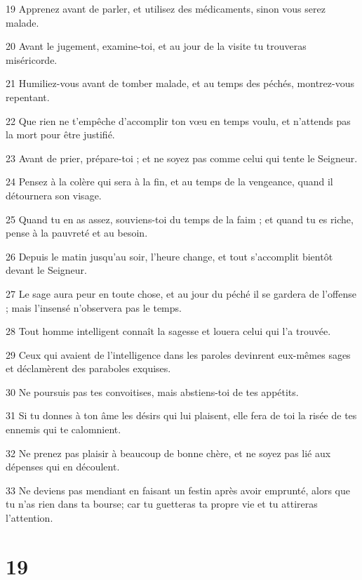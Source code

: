\par 19 Apprenez avant de parler, et utilisez des médicaments, sinon vous serez malade.
\par 20 Avant le jugement, examine-toi, et au jour de la visite tu trouveras miséricorde.
\par 21 Humiliez-vous avant de tomber malade, et au temps des péchés, montrez-vous repentant.
\par 22 Que rien ne t'empêche d'accomplir ton vœu en temps voulu, et n'attends pas la mort pour être justifié.
\par 23 Avant de prier, prépare-toi ; et ne soyez pas comme celui qui tente le Seigneur.
\par 24 Pensez à la colère qui sera à la fin, et au temps de la vengeance, quand il détournera son visage.
\par 25 Quand tu en as assez, souviens-toi du temps de la faim ; et quand tu es riche, pense à la pauvreté et au besoin.
\par 26 Depuis le matin jusqu'au soir, l'heure change, et tout s'accomplit bientôt devant le Seigneur.
\par 27 Le sage aura peur en toute chose, et au jour du péché il se gardera de l'offense ; mais l'insensé n'observera pas le temps.
\par 28 Tout homme intelligent connaît la sagesse et louera celui qui l'a trouvée.
\par 29 Ceux qui avaient de l'intelligence dans les paroles devinrent eux-mêmes sages et déclamèrent des paraboles exquises.
\par 30 Ne poursuis pas tes convoitises, mais abstiens-toi de tes appétits.
\par 31 Si tu donnes à ton âme les désirs qui lui plaisent, elle fera de toi la risée de tes ennemis qui te calomnient.
\par 32 Ne prenez pas plaisir à beaucoup de bonne chère, et ne soyez pas lié aux dépenses qui en découlent.
\par 33 Ne deviens pas mendiant en faisant un festin après avoir emprunté, alors que tu n'as rien dans ta bourse; car tu guetteras ta propre vie et tu attireras l'attention.

\chapter{19}

